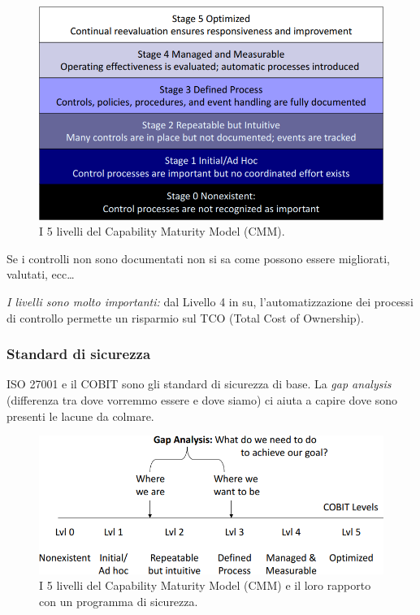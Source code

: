 \begin{figure}[h!]
        \begin{center}
                \includegraphics[scale=2.0]{res/img/maturity_level}
        \end{center}
        \caption{I 5 livelli del Capability Maturity Model (CMM).}
        \label{fig:cmm:levels}
\end{figure}

Se i controlli non sono documentati non si sa come possono essere migliorati,
valutati, ecc\dots

\emph{I livelli sono molto importanti:} dal Livello 4 in su,
l'automatizzazione dei processi di controllo permette un risparmio sul TCO
(Total Cost of Ownership).



\subsubsection{Standard di sicurezza}

ISO 27001 e il COBIT sono gli standard di sicurezza di base. La \textit{gap
analysis} (differenza tra dove vorremmo essere e dove siamo) ci aiuta a capire
dove sono presenti le lacune da colmare.

\begin{figure}[h!]
        \begin{center}
                \includegraphics[scale=2.0]{res/img/security_standard}
        \end{center}
        \caption{I 5 livelli del Capability Maturity Model (CMM) e il
        loro rapporto con un programma di sicurezza.}
\end{figure}


